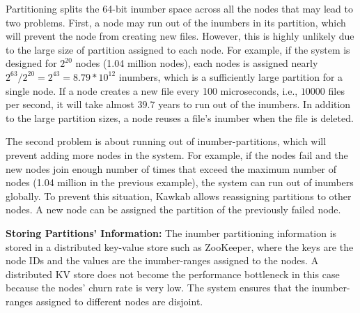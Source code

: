 \documentclass[]{article}
\newcommand{\subtopic}[1]{\vspace{1.5pt} \noindent \textbf{#1}}
\begin{document}
Partitioning splits the 64-bit inumber space across all the nodes that may lead to
two problems. First, a node may run out of the inumbers in its partition, which
will prevent the node from creating new files.  However, this is highly
unlikely due to the large size of partition assigned to each node. For example, if
the system is designed for $2^{20}$ nodes (1.04 million nodes), each nodes is
assigned nearly $2^{63} / 2^{20} = 2^{43} = 8.79 * 10^{12}$ inumbers, which is a
sufficiently large partition for a single node. If a node creates a new file
every 100 microseconds, i.e., $10000$ files per second, it will take almost
$39.7$ years to run out of the inumbers. In addition to the large partition
sizes, a node reuses a file's inumber when the file is deleted.

The second problem is about running out of inumber-partitions, which will
prevent adding more nodes in the system. For example, if the nodes fail and the
new nodes join enough number of times that exceed the maximum number of nodes
(1.04 million in the previous example), the system can run out of inumbers
globally. To prevent this situation, Kawkab allows reassigning partitions to
other nodes. A new node can be assigned the partition of the previously failed
node.


\subtopic{Storing Partitions' Information:} The inumber partitioning
information is stored in a distributed key-value store such as ZooKeeper, where
the keys are the node IDs and the values are the inumber-ranges assigned to the
nodes.  A distributed KV store does not become the performance bottleneck in
this case because the nodes' churn rate is very low.  The system ensures that
the inumber-ranges assigned to different nodes are disjoint.




%
\end{document}

